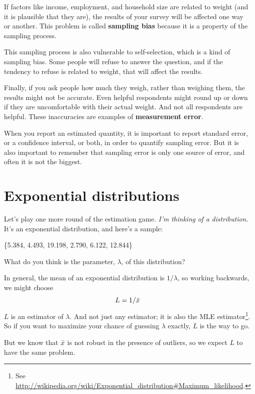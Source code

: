 \documentclass[12pt]{book}
\begin{document}
If factors like income, employment, and household size are related
to weight (and it is plausible that they are), the results of your
survey will be affected one way or another.  This problem is
called {\bf sampling bias} because it is a property of the sampling
process.

This sampling process is also vulnerable to 
self-selection, which is a kind of sampling bias.  Some
people will refuse to answer the question, and if the tendency
to refuse is related to weight, that will affect the results.

Finally, if you ask people how much they weigh, rather than weighing
them, the results might not be accurate.
Even helpful respondents might round up or down if they are
uncomfortable with their actual weight.  And not all respondents are
helpful.  These inaccuracies are examples of {\bf measurement
error}.

When you report an estimated quantity, it is important to report
standard error, or a confidence interval, or both, in order to
quantify sampling error.  But it is also important to remember that
sampling error is only one source of error, and often it is not the
biggest.


\section{Exponential distributions}

Let's play one more round of the estimation game.
{\em I'm thinking of a distribution.}  It's an exponential distribution, and 
here's a sample:

\{5.384, 4.493, 19.198, 2.790, 6.122, 12.844\}

What do you think is the parameter, $\lambda$, of this distribution?

\newcommand{\lamhat}{L}
\newcommand{\lamhatmed}{L_m}

In general, the mean of an exponential distribution is $1/\lambda$,
so working backwards, we might choose
%
\[ \lamhat = 1 / \xbar\]
%
$\lamhat$ is an
estimator of $\lambda$.  And not just any estimator; it is also the
MLE estimator\footnote{See
\url{http://wikipedia.org/wiki/Exponential_distribution#Maximum_likelihood}.}.
So if you want to maximize your chance of guessing $\lambda$ exactly,
$\lamhat$ is the way to go.

But we know that $\bar{x}$ is not robust in the presence of outliers, so
we expect $\lamhat$ to have the same problem.
\end{document}
